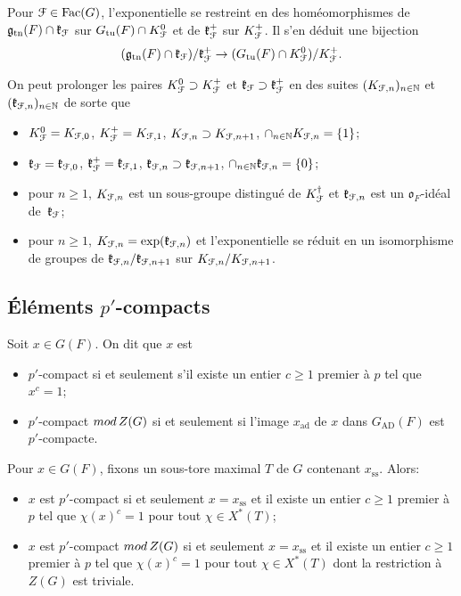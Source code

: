 \documentclass[11pt]{article}
\numberwithin{equation}{section}\providecommand{\og}{«\,}\providecommand{\fg}{\,»}
\let\mathcal \EuScript
\newcommand{\rmod}{\textup{mod}\,}
\newcommand{\frg}{\mathfrak{g}}
\newcommand{\frk}{\mathfrak{k}}
\newcommand{\fro}{\mathfrak{o}}
\newcommand{\AD}{\mathrm{AD}}
\newcommand{\Fac}{\mathrm{Fac}}
\newcommand{\rss}{\mathrm{ss}}
\newcommand{\tn}{\mathrm{tn}}
\newcommand{\tu}{\mathrm{tu}}
\DeclareMathOperator{\ad}{ad}
\newcommand{\cF}{\mathcal{F}}
\newcommand{\NN}{\mathbb{N}}
\theoremstyle{plain}
\theoremstyle{definition}
\begin{document}
Pour $\cF\in \Fac(G)$, l'exponentielle se restreint en des homéomorphismes de \hbox{$\frg_{\tn}(F)\cap \frk_{\cF}$} sur $G_{\tu}(F)\cap K_{\cF}^0$
et de $\frk_{\cF}^+$ sur $K_{\cF}^+$. Il s'en déduit une bijection
\[
(\frg_{\tn}(F)\cap \frk_{\cF})/\frk_{\cF}^+\to (G_{\tu}(F)\cap K_{\cF}^0)/K_{\cF}^+.
\]

On peut prolonger les paires $K_{\cF}^0\supset K_{\cF}^+$ et $\frk_{\cF}\supset \frk_{\cF}^+$
en des suites $(K_{\cF,n})_{n\in \NN}$ et $(\frk_{\cF,n})_{n\in \NN}$ de sorte que
\begin{itemize}
\item
$K_{\cF}^0=K_{\cF,0}$, $K_{\cF}^+ =K_{\cF,1}$, $K_{\cF,n}\supset K_{\cF,n+1}$, $\cap_{n\in \NN}K_{\cF,n}=\{1\}$;

\item
$\frk_{\cF}=\frk_{\cF,0}$, $\frk_{\cF}^+ =\frk_{\cF,1}$, $\frk_{\cF,n}\supset \frk_{\cF,n+1}$, $\cap_{n\in \NN}\frk_{\cF,n}=\{0\}$;

\item
pour $n\!\geq\!1$, $K_{\cF,n}$ est un sous-groupe distingué de $K_{\cF}^{\dag}$ et $\frk_{\cF,n}$ est un $\fro_{F}$-idéal de~$\frk_{\cF}$;

\item
pour $n\geq1$, $K_{\cF,n}=\exp(\frk_{\cF,n})$ et l'exponentielle se réduit en un isomorphisme de groupes de $\frk_{\cF,n}/\frk_{\cF,n+1}$ sur $K_{\cF,n}/K_{\cF,n+1}$.
\end{itemize}

\subsection{Éléments \texorpdfstring{$p'$}{p'}-compacts}\label{elementsp}

Soit $x\in G(F)$. On dit que $x$ est
\begin{itemize}
\item
$p'$-compact si et seulement s'il existe un entier $c\geq1$ premier à $p$ tel que $x^c=1$;

\item
$p'$-compact $\rmod Z(G)$ si et seulement si l'image $x_{\ad}$ de $x$ dans $G_{\AD}(F)$ est $p'$-compacte.
\end{itemize}

Pour $x\in G(F)$, fixons un sous-tore maximal $T$ de $G$ contenant $x_{\rss}$. Alors:

\begin{itemize}
\item
$x$ est $p'$-compact si et seulement $x=x_{\rss}$ et il existe un entier $c\geq1$ premier à $p$ tel que $\chi(x)^c=1$ pour tout $\chi\in X^*(T)$;

\item
$x$ est $p'$-compact $\rmod Z(G)$ si et seulement $x=x_{\rss}$ et il existe un entier $c\geq1$ premier à $p$ tel que $\chi(x)^c=1$ pour tout $\chi\in X^*(T)$ dont la restriction à $Z(G)$ est triviale.
\end{itemize}
\end{document}

